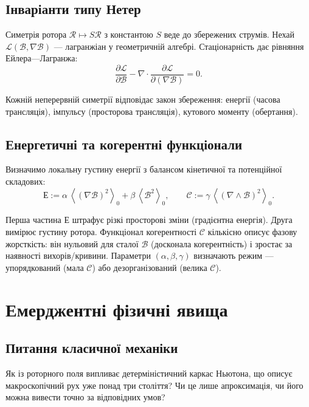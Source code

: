 \documentclass[11pt,a4paper]{article}
\newcommand{\grade}[2]{\left\langle #1 \right\rangle_{#2}}
\newcommand{\scal}[1]{\grade{#1}{0}}
\newcommand{\Rotor}{\mathcal{R}}
\newcommand{\Biv}{\mathcal{B}}
\newcommand{\D}{\nabla}                        %
\theoremstyle{definition}
\theoremstyle{plain}
\theoremstyle{remark}
\begin{document}
\subsection{Інваріанти типу Нетер}

Симетрія ротора $\Rotor\mapsto S\Rotor$ з константою $S$ веде до збережених струмів. Нехай $\mathcal{L}(\Biv,\D\Biv)$ — лагранжіан у геометричній алгебрі. Стаціонарність дає рівняння Ейлера—Лагранжа:
\begin{equation}
\frac{\partial \mathcal{L}}{\partial \Biv} - \D \cdot \frac{\partial \mathcal{L}}{\partial (\D\Biv)} = 0.
\end{equation}

Кожній неперервній симетрії відповідає закон збереження: енергії (часова трансляція), імпульсу (просторова трансляція), кутового моменту (обертання).

\subsection{Енергетичні та когерентні функціонали}

Визначимо локальну густину енергії з балансом кінетичної та потенційної складових:
\begin{equation}
  \mathcal{Е} := \alpha\, \scal{(\D \Biv)^2} + \beta\, \scal{\Biv^2},
  \qquad
  \mathcal{C} := \gamma\, \scal{(\D\wedge\Biv)^2}.
\end{equation}

Перша частина $\mathcal{Е}$ штрафує різкі просторові зміни (градієнтна енергія). Друга вимірює густину ротора. Функціонал когерентності $\mathcal{C}$ кількісно описує фазову жорсткість: він нульовий для сталої $\Biv$ (досконала когерентність) і зростає за наявності вихорів/кривини. Параметри $(\alpha,\beta,\gamma)$ визначають режим — упорядкований (мала $\mathcal{C}$) або дезорганізований (велика $\mathcal{C}$).

\vspace{1em}

\section{Емерджентні фізичні явища}\label{sec:emergent}

\subsection{Питання класичної механіки}

Як із роторного поля випливає детерміністичний каркас Ньютона, що описує макроскопічний рух уже понад три століття? Чи це лише апроксимація, чи його можна вивести точно за відповідних умов?
\end{document}
